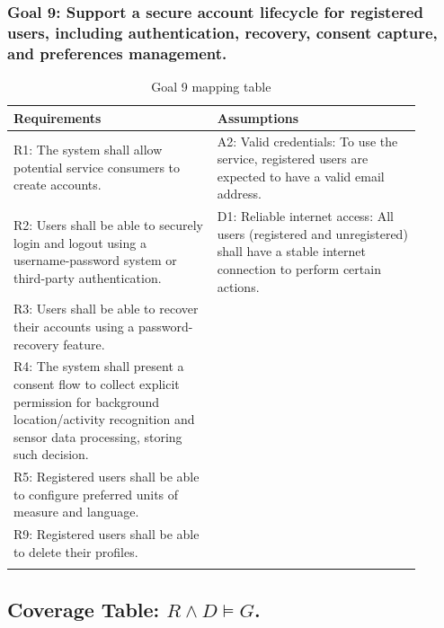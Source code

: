 \documentclass{Configuration_Files/PoliMi3i_thesis}
\begin{document}
    \subsubsection*{Goal 9: Support a secure account lifecycle for registered users, including authentication, recovery, consent capture, and preferences management.}
    \begin{longtable}{|p{0.45\linewidth}|p{0.45\linewidth}|}
    \hline
    \textbf{Requirements} & \textbf{Assumptions} \\ \hline
    R1: The system shall allow potential service consumers to create accounts.&A2: Valid credentials: To use the service, registered users are expected to have a valid email address.\\
    R2: Users shall be able to securely login and logout using a username-password system or third-party authentication.&D1: Reliable internet access: All users (registered and unregistered) shall have a stable internet connection to perform certain actions.\\
    R3: Users shall be able to recover their accounts using a password-recovery feature.&\\
    R4: The system shall present a consent flow to collect explicit permission for background location/activity recognition and sensor data processing, storing such decision.&\\
    R5: Registered users shall be able to configure preferred units of measure and language.&\\
    R9: Registered users shall be able to delete their profiles.&\\
    \hline
    \caption{Goal 9 mapping table}
    \end{longtable}


\subsection*{Coverage Table: $R \land D \models G $.}
\end{document}
